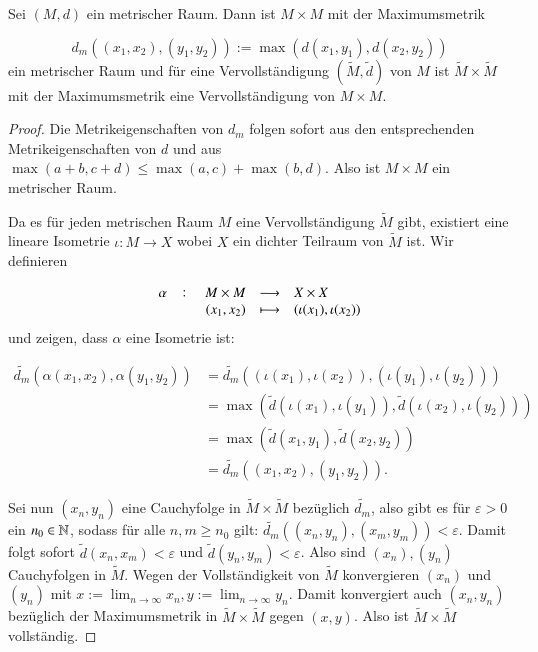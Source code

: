 
\begin{exercise}
  Sei $(M,d)$ ein metrischer Raum. Dann ist $M \times M$ mit der Maximumsmetrik

  \begin{equation*}
    d_m((x_1,x_2),(y_1,y_2)):=\max(d(x_1,y_1),d(x_2,y_2))
  \end{equation*}
  ein metrischer Raum und für eine Vervollständigung $(\widetilde{M},\widetilde{d})$ von $M$ ist $\widetilde{M} \times \widetilde{M}$ mit der Maximumsmetrik eine Vervollständigung von $M \times M$.
\end{exercise}

\begin{proof}
  Die Metrikeigenschaften von $d_m$ folgen sofort aus den entsprechenden Metrikeigenschaften von $d$ und aus $\max(a+b,c+d) \leq \max(a,c)+\max(b,d)$. Also ist $M \times M$ ein metrischer Raum.

  Da es für jeden metrischen Raum $M$ eine Vervollständigung $\widetilde{M}$ gibt, existiert eine lineare Isometrie $\iota:M \to X$ wobei $X$ ein dichter Teilraum von $\widetilde{M}$ ist. Wir definieren

  \begin{equation*}
    \fullfunction{\alpha}{M \times M}{X \times X}{(x_1,x_2)}{(\iota(x_1),\iota(x_2))}
  \end{equation*}
  und zeigen, dass $\alpha$ eine Isometrie ist:

  \begin{equation*}
    \begin{split}
      \widetilde{d_m}(\alpha(x_1,x_2), \alpha(y_1,y_2))
      &= \widetilde{d_m}((\iota(x_1),\iota(x_2)),(\iota(y_1),\iota(y_2))) \\
      &= \max(\widetilde{d}(\iota(x_1),\iota(y_1)),\widetilde{d}(\iota(x_2),\iota(y_2))) \\
      &= \max(\widetilde{d}(x_1,y_1),\widetilde{d}(x_2,y_2)) \\
      &= \widetilde{d_m}((x_1,x_2),(y_1,y_2)).
    \end{split}
  \end{equation*}

  Sei nun $(x_n,y_n)$ eine Cauchyfolge in $\widetilde{M} \times \widetilde{M}$ bezüglich $\widetilde{d_m}$, also gibt es für $\varepsilon>0$ ein $n_0 \in \mathbb{N}$, sodass für alle $n,m \geq n_0$ gilt: $\widetilde{d_m}((x_n,y_n),(x_m,y_m))<\varepsilon$. Damit folgt sofort $\widetilde{d}(x_n,x_m)<\varepsilon$ und $\widetilde{d}(y_n,y_m)<\varepsilon$. Also sind $(x_n),(y_n)$ Cauchyfolgen in $\widetilde{M}$. Wegen der Vollständigkeit von $\widetilde{M}$ konvergieren $(x_n)$ und $(y_n)$ mit $x:=\lim_{n \to \infty}{x_n},y:=\lim_{n \to \infty}{y_n}$. Damit konvergiert auch $(x_n,y_n)$ bezüglich der Maximumsmetrik in $\widetilde{M} \times \widetilde{M}$ gegen $(x,y)$. Also ist $\widetilde{M} \times \widetilde{M}$ vollständig.


\end{proof}
